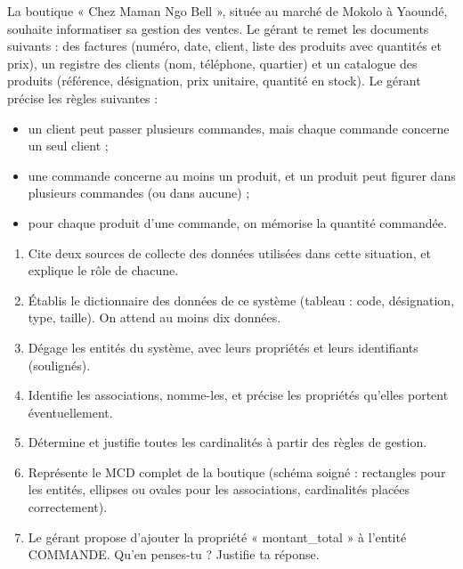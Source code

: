 \documentclass[11pt]{article}
\begin{document}
\begin{exercice}
La boutique « Chez Maman Ngo Bell », située au marché de Mokolo à Yaoundé, souhaite informatiser sa gestion des ventes. Le gérant te remet les documents suivants : des factures (numéro, date, client, liste des produits avec quantités et prix), un registre des clients (nom, téléphone, quartier) et un catalogue des produits (référence, désignation, prix unitaire, quantité en stock). Le gérant précise les règles suivantes :
\begin{itemize}
\item un client peut passer plusieurs commandes, mais chaque commande concerne un seul client ;
\item une commande concerne au moins un produit, et un produit peut figurer dans plusieurs commandes (ou dans aucune) ;
\item pour chaque produit d'une commande, on mémorise la quantité commandée.
\end{itemize}

\begin{enumerate}
\item Cite deux sources de collecte des données utilisées dans cette situation, et explique le rôle de chacune.
\item Établis le dictionnaire des données de ce système (tableau : code, désignation, type, taille). On attend au moins dix données.
\item Dégage les entités du système, avec leurs propriétés et leurs identifiants (soulignés).
\item Identifie les associations, nomme-les, et précise les propriétés qu'elles portent éventuellement.
\item Détermine et justifie toutes les cardinalités à partir des règles de gestion.
\item Représente le MCD complet de la boutique (schéma soigné : rectangles pour les entités, ellipses ou ovales pour les associations, cardinalités placées correctement).
\item Le gérant propose d'ajouter la propriété « montant\_total » à l'entité COMMANDE. Qu'en penses-tu ? Justifie ta réponse.
\end{enumerate}
\end{exercice}
\end{document}

